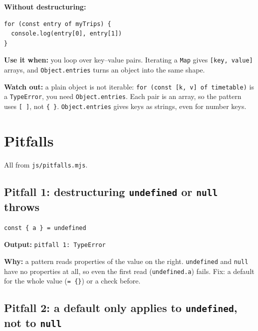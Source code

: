\documentclass[
  10pt,
]{article}
\begin{document}
\textbf{Without destructuring:}

\begin{verbatim}
for (const entry of myTrips) {
  console.log(entry[0], entry[1])
}
\end{verbatim}

\textbf{Use it when:} you loop over key--value pairs. Iterating a
\texttt{Map} gives \texttt{[\allowbreak{}key,\allowbreak{} value]}
arrays, and \texttt{Object.\allowbreak{}entries} turns an object into
the same shape.

\textbf{Watch out:} a plain object is not iterable:
\texttt{for (\allowbreak{}const [\allowbreak{}k,\allowbreak{} v] of timetable)}
is a \texttt{TypeError}, you need \texttt{Object.\allowbreak{}entries}.
Each pair is an array, so the pattern uses \texttt{[\allowbreak{} ]},
not \texttt{\{ \}}. \texttt{Object.\allowbreak{}entries} gives keys as
strings, even for number keys.

\hypertarget{pitfalls}{%
\section{Pitfalls}\label{pitfalls}}

All from \texttt{js/\allowbreak{}pitfalls.\allowbreak{}mjs}.

\hypertarget{pitfall-1-destructuring-undefined-or-null-throws}{%
\subsection{\texorpdfstring{Pitfall 1: destructuring \texttt{undefined}
or \texttt{null}
throws}{Pitfall 1: destructuring  or  throws}}\label{pitfall-1-destructuring-undefined-or-null-throws}}

\begin{verbatim}
const { a } = undefined
\end{verbatim}

\textbf{Output:} \texttt{pitfall 1:\allowbreak{} TypeError}

\textbf{Why:} a pattern reads properties of the value on the right.
\texttt{undefined} and \texttt{null} have no properties at all, so even
the first read (\texttt{undefined.\allowbreak{}a}) fails. Fix: a default
for the whole value (\texttt{=\allowbreak{} \{\}}) or a check before.

\hypertarget{pitfall-2-a-default-only-applies-to-undefined-not-to-null}{%
\subsection{\texorpdfstring{Pitfall 2: a default only applies to
\texttt{undefined}, not to
\texttt{null}}{Pitfall 2: a default only applies to , not to }}\label{pitfall-2-a-default-only-applies-to-undefined-not-to-null}}
\end{document}
